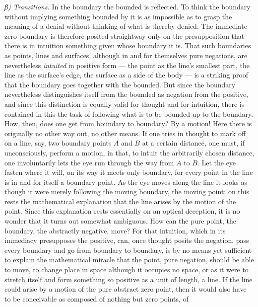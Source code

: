 \documentclass[12pt,a4paper]{book}
\begin{document}
\emph{β) Transitions.} In the boundary the bounded is reflected. To think the
boundary without implying something bounded by it is as impossible as to grasp
the meaning of a denial without thinking of what is thereby
denied. The immediate zero-boundary is therefore posited straightway only on
the presupposition that there is in intuition
something given whose boundary it is. That such boundaries as points, lines and
surfaces, although in and for themselves pure negations, are nevertheless
\emph{intuited} in positive form --- the point as the line's smallest part, the
line as the surface's edge, the surface as a side of the body --- is a striking
proof that the boundary goes together with the bounded. But since the boundary
nevertheless distinguishes itself from the bounded as negation from the
positive, and since this distinction is equally valid for thought and for
intuition, there is contained in this the task of following what is to be
bounded up to the boundary. How, then, does one get from boundary to boundary?
By a motion! Here there is originally no other way out, no other means. If one
tries in thought to mark off on a line, say, two boundary points $A$ and $B$ at
a certain distance, one must, if unconsciously, perform a motion, in that, to
intuit the arbitrarily chosen distance, one involuntarily lets the eye run
through the way from $A$ to $B$. Let the eye fasten where it will, on its way
it meets only boundary, for every point in the line is in and for itself a
boundary point. As the eye moves along the line it looks as though it were
merely following the moving boundary, the moving point; on this rests the
mathematical explanation that the line arises by the motion of the point. Since
this explanation rests essentially on an optical deception, it is no wonder
that it turns out somewhat ambiguous. How can the pure point, the boundary, the
abstractly negative, move? For that intuition, which in its immediacy
presupposes the positive, can, once thought posits the negation, pass every
boundary and go from boundary to boundary, is by no means yet sufficient to
explain the mathematical miracle that the point, pure negation, should be able
to move, to change place in space although it occupies no space, or as it were
to stretch itself and form something so positive as a unit of length, a line.
If the line could arise
\setcounter{footnote}{0}
by a motion of the pure abstract zero point, then it would also have to be
conceivable as composed of nothing but zero points, of
\end{document}
